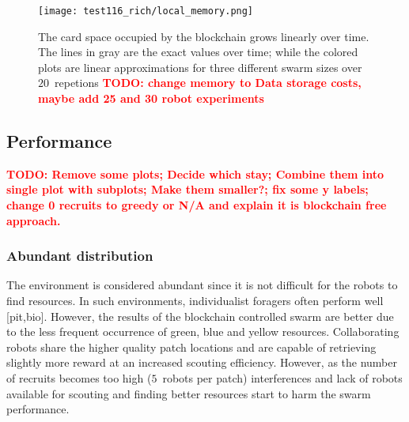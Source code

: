 \documentclass[runningheads]{llncs}
\newcommand{\todo}[1]{\textcolor{red}{\textbf{TODO: #1}}}
\begin{document}
\begin{figure}
  \centering
  \texttt{[image: test116\_rich/local\_memory.png]}
  \caption{The card space occupied by the blockchain grows linearly over time. The lines in gray are the exact values over time; while the colored plots are linear approximations for three different swarm sizes over $20$~repetions \todo{change memory to Data storage costs, maybe add 25 and 30 robot experiments}} 
  \label{fig:data-storage}
\end{figure}



\subsection{Performance}
\label{subsec:performance}

\todo{Remove some plots; Decide which stay; Combine them into single plot with subplots; Make them smaller?; fix some y labels; change 0 recruits to greedy or N/A and explain it is blockchain free approach.}

\subsubsection{Abundant distribution}

The environment is considered abundant since it is not difficult for the robots to find resources. In such environments, individualist foragers often perform well [pit,bio]. However, the results of the blockchain controlled swarm are better due to the less frequent occurrence of green, blue and yellow resources. Collaborating robots share the higher quality patch locations and are capable of retrieving slightly more reward at an increased scouting efficiency. However, as the number of recruits becomes too high ($5$~robots per patch) interferences and lack of robots available for scouting and finding better resources start to harm the swarm performance.
\end{document}
